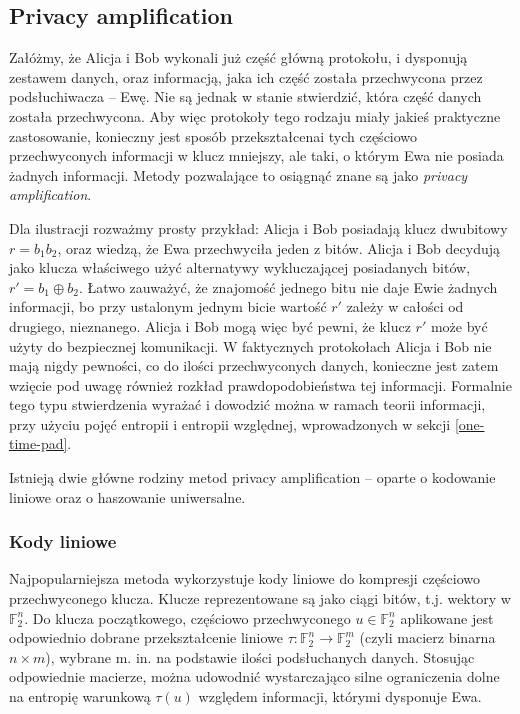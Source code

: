 \documentclass[10pt]{article}
\begin{document}
\subsection{Privacy amplification}

Załóżmy, że Alicja i Bob wykonali już część główną protokołu, i dysponują zestawem danych, oraz
informacją, jaka ich część została przechwycona przez podsłuchiwacza -- Ewę. Nie są jednak w stanie
stwierdzić, która część danych została przechwycona. Aby więc protokoły tego rodzaju miały jakieś
praktyczne zastosowanie, konieczny jest sposób przekształcenai tych częściowo przechwyconych informacji
w klucz mniejszy, ale taki, o którym Ewa nie posiada żadnych informacji. Metody pozwalające to osiągnąć
znane są jako \emph{privacy amplification}\cite{Watanabe07}.

Dla ilustracji rozważmy prosty przykład: Alicja i Bob posiadają klucz dwubitowy \(r = b_1 b_2\), oraz
wiedzą, że Ewa przechwyciła jeden z bitów. Alicja i Bob decydują jako klucza właściwego użyć alternatywy
wykluczającej posiadanych bitów, \(r' = b_1 \oplus b_2\). Łatwo zauważyć, że znajomość jednego bitu
nie daje Ewie żadnych informacji, bo przy ustalonym jednym bicie wartość \(r'\) zależy w całości od 
drugiego, nieznanego. Alicja i Bob mogą więc być pewni, że klucz \(r'\) może być użyty do bezpiecznej
komunikacji. W faktycznych protokołach Alicja i Bob nie mają nigdy pewności, co do ilości przechwyconych 
danych, konieczne jest zatem wzięcie pod uwagę również rozkład prawdopodobieństwa tej informacji. 
Formalnie tego typu stwierdzenia wyrażać i dowodzić można w ramach teorii informacji, przy użyciu pojęć
entropii i entropii względnej, wprowadzonych w sekcji \ref{one-time-pad}.

Istnieją dwie główne rodziny metod privacy amplification -- oparte o kodowanie liniowe oraz o
haszowanie uniwersalne.

\subsubsection*{Kody liniowe}
Najpopularniejsza metoda wykorzystuje kody liniowe do kompresji częściowo przechwyconego klucza\cite{Mayers01}.
Klucze reprezentowane są jako ciągi bitów, t.j. wektory w \(\mathbb{F}_2^n\). Do klucza początkowego,
częściowo przechwyconego \(u\in\mathbb{F}_2^n\) aplikowane jest odpowiednio dobrane przekształcenie 
liniowe \(\tau\colon\mathbb{F}_2^n\rightarrow \mathbb{F}_2^m\) (czyli macierz binarna \(n\times m\)), 
wybrane m. in. na podstawie ilości podsłuchanych danych. Stosując odpowiednie macierze, można udowodnić
wystarczająco silne ograniczenia dolne na entropię warunkową \(\tau(u)\) względem informacji,
którymi dysponuje Ewa.
\end{document}
